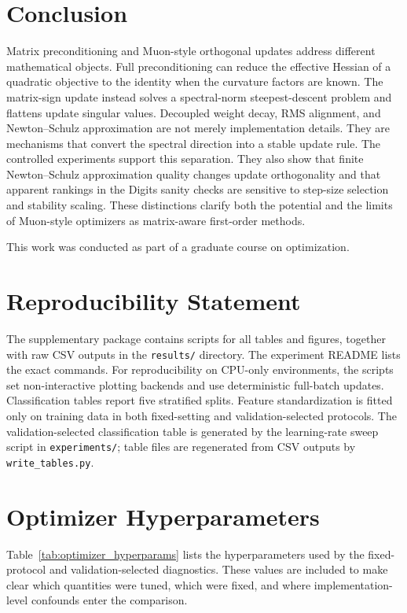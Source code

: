 \documentclass[sigconf,nonacm]{acmart}
\begin{document}
\section{Conclusion}
Matrix preconditioning and Muon-style orthogonal updates address different mathematical objects. Full preconditioning can reduce the effective Hessian of a quadratic objective to the identity when the curvature factors are known. The matrix-sign update instead solves a spectral-norm steepest-descent problem and flattens update singular values. Decoupled weight decay, RMS alignment, and Newton--Schulz approximation are not merely implementation details. They are mechanisms that convert the spectral direction into a stable update rule. The controlled experiments support this separation. They also show that finite Newton--Schulz approximation quality changes update orthogonality and that apparent rankings in the Digits sanity checks are sensitive to step-size selection and stability scaling. These distinctions clarify both the potential and the limits of Muon-style optimizers as matrix-aware first-order methods.

\begin{acks}
This work was conducted as part of a graduate course on optimization.
\end{acks}




\appendix
\section{Reproducibility Statement}
The supplementary package contains scripts for all tables and figures, together with raw CSV outputs in the \texttt{results/} directory. The experiment README lists the exact commands. For reproducibility on CPU-only environments, the scripts set non-interactive plotting backends and use deterministic full-batch updates. Classification tables report five stratified splits. Feature standardization is fitted only on training data in both fixed-setting and validation-selected protocols. The validation-selected classification table is generated by the learning-rate sweep script in \texttt{experiments/}; table files are regenerated from CSV outputs by \texttt{write\_tables.py}.

\section{Optimizer Hyperparameters}
Table~\ref{tab:optimizer_hyperparams} lists the hyperparameters used by the fixed-protocol and validation-selected diagnostics. These values are included to make clear which quantities were tuned, which were fixed, and where implementation-level confounds enter the comparison.
\end{document}
